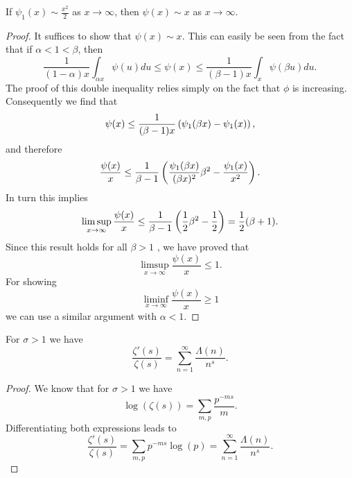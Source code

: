 \begin{lemma}
	If $\psi_1(x) \sim \frac{x^2}{2}$ as $x \to \infty$, then $\psi(x) \sim x$ as $x \to \infty$.
\end{lemma}
\begin{proof}
	It suffices to show that $\psi(x) \sim x$. This can easily be seen from the fact that if $\alpha < 1 < \beta$, then
\begin{equation*}
	\frac{1}{(1 - \alpha) x} \int _{\alpha x} \psi(u) du \leq \psi(x) \leq \frac{1}{(\beta - 1) x} \int _{x} \psi(\beta u) du.
\end{equation*}
	The proof of this double inequality relies simply on the fact that $\phi$ is increasing. Consequently we find that
\begin{equation*}
	\psi(x) \leq \frac{1}{(\beta - 1)x} \left(\psi_1(\beta x) - \psi_1(x)\right),
\end{equation*}
	and therefore
\begin{equation*}
	\frac{\psi(x)}{x} \leq \frac{1}{\beta - 1} \left(\frac{\psi_1(\beta x)}{(\beta x)^2} \beta^2 - \frac{\psi_1(x)}{x^2}\right).
\end{equation*}
	In turn this implies
\begin{equation*}
	\limsup _{x \to \infty} \frac{\psi(x)}{x} \leq \frac{1}{\beta - 1} \left(\frac{1}{2} \beta^2 - \frac{1}{2}\right) = \frac{1}{2} (\beta + 1).
\end{equation*}
	Since this result holds for all $\beta > 1$ , we have proved that
\begin{equation*}
	\limsup _{x \to \infty} \frac{\psi(x)}{x} \leq 1. 
\end{equation*}
	For showing
\begin{equation*}
	\liminf _{x \to \infty} \frac{\psi(x)}{x} \geq 1
\end{equation*}
	we can use a similar argument with $\alpha < 1$.
\end{proof}


\begin{lemma}
	For $\sigma > 1$ we have
\begin{equation*}
	\frac{\zeta'(s)}{\zeta(s)} = \sum _{n = 1} ^\infty \frac{\Lambda(n)}{n^s}.
\end{equation*}
\end{lemma}
\begin{proof}
	We know that for $\sigma > 1$ we have
\begin{equation*}
	\log(\zeta(s)) = \sum _{m,p} \frac{p^{-ms}}{m}.
\end{equation*}
	Differentiating both expressions leads to
\begin{equation*}
	\frac{\zeta'(s)}{\zeta(s)} = \sum _{m,p} p^{-ms} \log(p) = \sum _{n = 1} ^\infty \frac{\Lambda(n)}{n^s}.
\end{equation*}
\end{proof}


